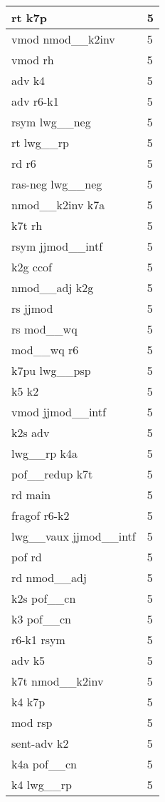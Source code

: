 \documentclass[a4 paper]{article}
\begin{document}
\begin{longtable}{p{}p{}}
rt k7p  & 5 \\ \midrule
vmod nmod\_\_k2inv  & 5 \\ \midrule
vmod rh  & 5 \\ \midrule
adv k4  & 5 \\ \midrule
adv r6-k1  & 5 \\ \midrule
rsym lwg\_\_neg  & 5 \\ \midrule
rt lwg\_\_rp  & 5 \\ \midrule
rd r6  & 5 \\ \midrule
ras-neg lwg\_\_neg  & 5 \\ \midrule
nmod\_\_k2inv k7a  & 5 \\ \midrule
k7t rh  & 5 \\ \midrule
rsym jjmod\_\_intf  & 5 \\ \midrule
k2g ccof  & 5 \\ \midrule
nmod\_\_adj k2g  & 5 \\ \midrule
rs jjmod  & 5 \\ \midrule
rs mod\_\_wq  & 5 \\ \midrule
mod\_\_wq r6  & 5 \\ \midrule
k7pu lwg\_\_psp  & 5 \\ \midrule
k5 k2  & 5 \\ \midrule
vmod jjmod\_\_intf  & 5 \\ \midrule
k2s adv  & 5 \\ \midrule
lwg\_\_rp k4a  & 5 \\ \midrule
pof\_\_redup k7t  & 5 \\ \midrule
rd main  & 5 \\ \midrule
fragof r6-k2  & 5 \\ \midrule
lwg\_\_vaux jjmod\_\_intf  & 5 \\ \midrule
pof rd  & 5 \\ \midrule
rd nmod\_\_adj  & 5 \\ \midrule
k2s pof\_\_cn  & 5 \\ \midrule
k3 pof\_\_cn  & 5 \\ \midrule
r6-k1 rsym  & 5 \\ \midrule
adv k5  & 5 \\ \midrule
k7t nmod\_\_k2inv  & 5 \\ \midrule
k4 k7p  & 5 \\ \midrule
mod rsp  & 5 \\ \midrule
sent-adv k2  & 5 \\ \midrule
k4a pof\_\_cn  & 5 \\ \midrule
k4 lwg\_\_rp  & 5 \\ \midrule

\end{longtable}
\end{document}
